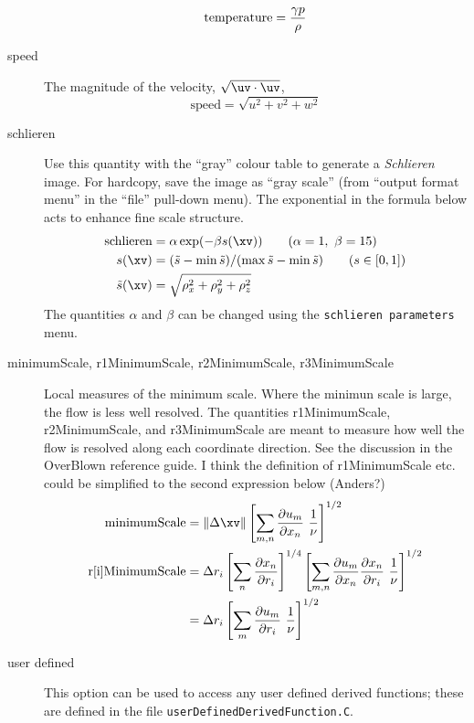 \documentclass{article}
\begin{document}
\begin{description}
\[       \mbox{temperature}  = { \gamma p \over \rho }
     \]
  \item[speed] The magnitude of the velocity, $\sqrt{\uv\cdot\uv}$,
    \[
         \mbox{speed} = \sqrt{ u^2 + v^2 + w^2 }
    \]
  \item[schlieren] Use this quantity with the ``gray'' colour table to generate a {\it Schlieren} image.
     For hardcopy, save the image as ``gray scale'' (from ``output format menu'' in the ``file'' pull-down menu).
     The exponential in the formula below acts to enhance fine scale structure.
    \begin{align*}
         \mbox{schlieren} & = \alpha \exp( -\beta s(\xv) ) \qquad  ( \alpha = 1, ~\beta = 15) \\
          s(\xv) & = (\tilde{s} - \min \tilde{s})/( \max \tilde{s} - \min \tilde{s} ) \qquad (s \in [0,1]) \\
          \tilde{s}(\xv) & = \sqrt{ \rho_x^2 + \rho_y^2 + \rho_z^2 } 
    \end{align*}
    The quantities $\alpha$ and $\beta$ can be changed using the {\tt schlieren parameters} menu.
  \item[minimumScale, r1MinimumScale, r2MinimumScale, r3MinimumScale] Local measures of the minimum scale.
   Where the minimun scale is large, the flow is less well resolved. The quantities 
  r1MinimumScale, r2MinimumScale, and r3MinimumScale are meant to measure how well the flow is
  resolved along each coordinate direction.
   See the discussion in the OverBlown reference guide. I think the definition of r1MinimumScale etc.
   could be simplified to the second expression below (Anders?)
    \begin{align*}
  \mbox{minimumScale} & =  \| \Delta \xv \| \left[ \sum_{m,n} {\partial u_m \over \partial x_n} 
                    ~{1 \over \nu} \right]^{1/2} \\
  \mbox{r[i]MinimumScale} & =  
          \Delta r_i   \left[ \sum_n {\partial x_n \over \partial r_i} \right]^{1/4}
        \left[ \sum_{m,n} {\partial u_m \over \partial x_n}{\partial x_n \over \partial r_i} 
              ~{1 \over \nu} \right]^{1/2}  \\
                &=  \Delta r_i \left[ \sum_{m} {\partial u_m \over \partial r_i}  ~{1 \over \nu} \right]^{1/2} 
    \end{align*}
  \item[user defined] This option can be used to access any user defined derived functions; these
    are defined in the file {\tt userDefinedDerivedFunction.C}.

\end{description}
\end{document}
